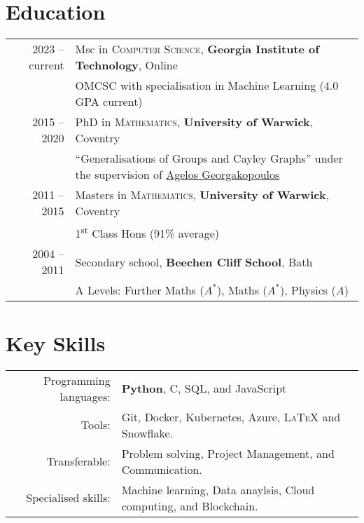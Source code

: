 \documentclass[a4paper,10pt]{article}
\begin{document}
\vspace{-0.5cm}
\section{Education}
\begin{tabular}{rl}
	\textsc{} 2023 -- current & Msc in \textsc{Computer Science}, \textbf{Georgia Institute of Technology}, Online\\
	& OMCSC with specialisation in Machine Learning (4.0 GPA current)\\
	\textsc{} 2015 -- 2020 & PhD in \textsc{Mathematics}, \textbf{University of Warwick}, Coventry\\
	& ``Generalisations of Groups and Cayley Graphs'' under the supervision of \href{https://homepages.warwick.ac.uk/~maslar/}{Agelos Georgakopoulos}\\
	\textsc{} 2011 -- 2015& Masters in \textsc{Mathematics}, \textbf{University of Warwick}, Coventry\\
	& 1\textsuperscript{st} Class Hons (91\% average)\\
	\textsc{} 2004 -- 2011& Secondary school, \textbf{Beechen Cliff School}, Bath\\
	&  A Levels: Further Maths ($A^{\ast}$), Maths ($A^{\ast}$), Physics ($A$)
\end{tabular}

\vspace{-0.05 in}

\section{Key Skills}
\begin{tabular}{rl}
	Programming languages: & \textbf{Python}, C, SQL, and JavaScript\\
	Tools: & Git, Docker, Kubernetes, Azure, \textsc{LaTeX} and Snowflake.\\
	Transferable: & Problem solving, Project Management, and Communication.\\
	Specialised skills: & Machine learning, Data anaylsis, Cloud computing, and Blockchain.\\
\end{tabular}
\vspace{-0.05 in}
\end{document}
